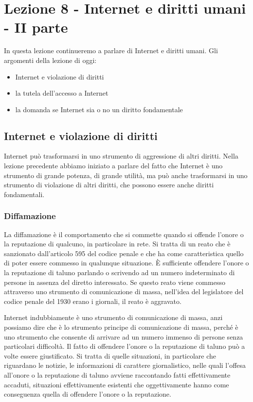\chapter{Lezione 8 -  Internet e diritti umani - II parte}

In questa lezione continueremo a parlare di Internet e diritti umani. Gli argomenti della lezione di oggi:
\begin{itemize}
    \item Internet e violazione di diritti
    \item la tutela dell'accesso a Internet
    \item la domanda se Internet sia o no un diritto fondamentale
\end{itemize}

\section{Internet e violazione di diritti}

Internet può trasformarsi in uno strumento di aggressione di altri diritti. Nella lezione precedente abbiamo iniziato a parlare del fatto che Internet è uno strumento di grande potenza, di grande utilità, ma può anche trasformarsi in uno strumento di violazione di altri diritti, che possono essere anche diritti fondamentali.\par

\subsection{Diffamazione}

La diffamazione è il comportamento che si commette quando si offende l'onore o la reputazione di qualcuno, in particolare in rete. Si tratta di un reato che è sanzionato dall'articolo 595 del codice penale e che ha come caratteristica quello di poter essere commesso in qualunque situazione. È sufficiente offendere l'onore o la reputazione di taluno parlando o scrivendo ad un numero indeterminato di persone in assenza del diretto interessato. Se questo reato viene commesso attraverso uno strumento di comunicazione di massa, nell'idea del legislatore del codice penale del 1930 erano i giornali, il reato è aggravato.

Internet indubbiamente è uno strumento di comunicazione di massa, anzi possiamo dire che è lo strumento principe di comunicazione di massa, perché è uno strumento che consente di arrivare ad un numero immenso di persone senza particolari difficoltà. Il fatto di offendere l'onore o la reputazione di taluno può a volte essere giustificato. Si tratta di quelle situazioni, in particolare che riguardano le notizie, le informazioni di carattere giornalistico, nelle quali l'offesa all'onore o la reputazione di taluno avviene raccontando fatti effettivamente accaduti, situazioni effettivamente esistenti che oggettivamente hanno come conseguenza quella di offendere l'onore o la reputazione.

